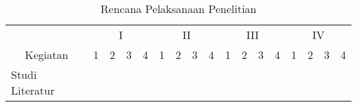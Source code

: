 \begin{table}[h!]
	\centering
	\caption{Rencana Pelaksanaan Penelitian}
	\label{tab:kegiatan}
	\begin{tabular}{|l|llll|llll|llll|llll|}
		\hline
		\multicolumn{1}{|c|}{}                           & \multicolumn{4}{c|}{I}                                                                                                                                                                        & \multicolumn{4}{c|}{II}                                                                                                                                                  & \multicolumn{4}{c|}{III}                                                                                                                                                 & \multicolumn{4}{c|}{IV}                                                                                                                                                  \\ \cline{2-17} 
		\multicolumn{1}{|c|}{\multirow{-2}{*}{Kegiatan}} & \multicolumn{1}{c|}{1}                        & \multicolumn{1}{c|}{2}                        & \multicolumn{1}{c|}{3}                        & \multicolumn{1}{c|}{4}                        & \multicolumn{1}{c|}{1}                        & \multicolumn{1}{c|}{2}                        & \multicolumn{1}{c|}{3}                        & \multicolumn{1}{c|}{4}   & \multicolumn{1}{c|}{1}                        & \multicolumn{1}{c|}{2}                        & \multicolumn{1}{c|}{3}                        & \multicolumn{1}{c|}{4}   & \multicolumn{1}{c|}{1}                        & \multicolumn{1}{c|}{2}                        & \multicolumn{1}{c|}{3}                        & \multicolumn{1}{c|}{4}   \\ \hline
		Studi Literatur                                  & \multicolumn{1}{c|}{\cellcolor[HTML]{9B9B9B}} & \multicolumn{1}{c|}{\cellcolor[HTML]{9B9B9B}} & \multicolumn{1}{c|}{}                         & \multicolumn{1}{c|}{}                         & \multicolumn{1}{c|}{}                         & \multicolumn{1}{c|}{}                         & \multicolumn{1}{c|}{}                         & \multicolumn{1}{c|}{}    & \multicolumn{1}{c|}{}                         & \multicolumn{1}{c|}{}                         & \multicolumn{1}{c|}{}                         & \multicolumn{1}{c|}{}    & \multicolumn{1}{c|}{}                         & \multicolumn{1}{c|}{}                         & \multicolumn{1}{c|}{}                         & \multicolumn{1}{c|}{}    \\ \hline

\end{tabular}
\end{table}
